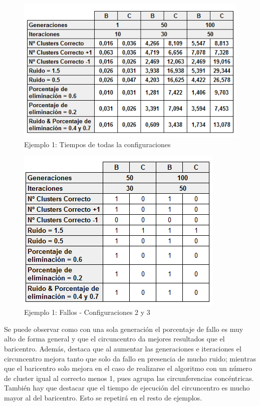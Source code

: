 \documentclass[conference,a4paper]{IEEEtran}
\begin{document}
\begin{figure}[H]
\centering
\includegraphics[scale=0.6]{Experimentacion/Ejemplo1/Ejemplo1Completo}
\caption{Ejemplo 1: Tiempos de todas la configuraciones}
\end{figure}

\begin{figure}[H]
\centering
\includegraphics[scale=0.7]{Experimentacion/Ejemplo1/Ejemplo1Fallos}
\caption{Ejemplo 1: Fallos - Configuraciones 2 y 3}
\end{figure}

Se puede observar como con una sola generación el porcentaje de fallo es muy alto de forma general y que el circuncentro da mejores resultados que el baricentro. Además, destaca que al aumentar las generaciones e iteraciones el circuncentro mejora tanto que solo da fallo en presencia de mucho ruido; mientras que el baricentro solo mejora en el caso de realizarse el algoritmo con un número de cluster igual al correcto menos 1, pues agrupa las circunferencias concéntricas. También hay que destacar que el tiempo de ejecución del circuncentro es mucho mayor al del baricentro. Esto se repetirá en el resto de ejemplos.
\end{document}
